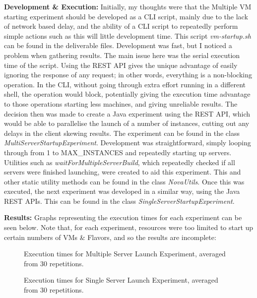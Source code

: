 \textbf{Development \& Execution:}
Initially, my thoughts were that the Multiple VM starting experiment should be developed as a CLI script, mainly due to the lack of network based delay, and the ability of a CLI script to repeatedly perform simple actions such as this will little development time. This script \textit{vm-startup.sh} can be found in the deliverable files. Development was fast, but I noticed a problem when gathering results. 
The main issue here was the serial execution time of the script. Using the REST API gives the unique advantage of easily ignoring the response of any request; in other words, everything is a non-blocking operation. In the CLI, without going through extra effort running in a different shell, the operation would block, potentially giving the execution time advantage to those operations starting less machines, and giving unreliable results. 
The decision then was made to create a Java experiment using the REST API, which would be able to parallelise the launch of a number of instances, cutting out any delays in the client skewing results. The experiment can be found in the class \textit{MultiServerStartupExperiment}. Development was straightforward, simply looping through from 1 to MAX\_INSTANCES and repeatedly starting up servers. Utilities such as \textit{waitForMultipleServerBuild}, which repeatedly checked if all servers were finished launching, were created to aid this experiment. This and other static utility methods can be found in the class \textit{NovaUtils}. 
Once this was executed, the next experiment was developed in a similar way, using the Java REST APIs. This can be found in the class \textit{SingleServerStartupExperiment}.

\textbf{Results:}
Graphs representing the execution times for each experiment can be seen below. Note that, for each experiment, resources were too limited to start up certain numbers of VMs \& Flavors, and so the results are incomplete: 

\begin{figure}[H]
\centering
{}
\caption{Execution times for Multiple Server Launch Experiment, averaged from 30 repetitions.}
\end{figure}

\begin{figure}[H]
\centering
{}
\caption{Execution times for Single Server Launch Experiment, averaged from 30 repetitions.}
\end{figure}


